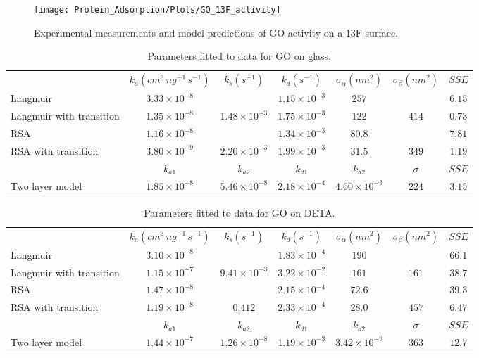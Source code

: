 %
\begin{figure}
\texttt{[image: Protein\_Adsorption/Plots/GO\_13F\_activity]}

\caption{\label{fig:GO 13F activity}Experimental measurements and model predictions
of GO activity on a 13F surface.}
%
\end{figure}
%
\begin{table}
\caption{\label{tab:GO params glass}Parameters fitted to data for GO on glass.}
\begin{tabular}{>{\raggedright}p{0.75in}cccccc}
 & $k_{a}\left(cm^{3}\, ng^{-1}\, s^{-1}\right)$ & $k_{s}\left(s^{-1}\right)$ & $k_{d}\left(s^{-1}\right)$ & $\sigma_{\alpha}\left(nm^{2}\right)$ & $\sigma_{\beta}\left(nm^{2}\right)$ & $SSE$\tabularnewline[\doublerulesep]
\cline{2-7} 
\noalign{\vskip\doublerulesep}
Langmuir & $3.33\times10^{-8}$ &  & $1.15\times10^{-3}$ & $257$ &  & $6.15$\tabularnewline
Langmuir with transition & $1.35\times10^{-8}$ & $1.48\times10^{-3}$ & $1.75\times10^{-3}$ & $122$ & $414$ & $0.73$\tabularnewline
\noalign{\vskip\doublerulesep}
RSA & $1.16\times10^{-8}$ &  & $1.34\times10^{-3}$ & $80.8$ &  & $7.81$\tabularnewline
\noalign{\vskip\doublerulesep}
RSA with transition & $3.80\times10^{-9}$ & $2.20\times10^{-3}$ & $1.99\times10^{-3}$ & $31.5$ & $349$ & $1.19$\tabularnewline
\noalign{\vskip\doublerulesep}
\noalign{\vskip\doublerulesep}
 & $k_{a1}$ & $k_{a2}$ & $k_{d1}$ & $k_{d2}$ & $\sigma$ & $SSE$\tabularnewline
Two layer model & $1.85\times10^{-8}$ & $5.46\times10^{-8}$ & $2.18\times10^{-4}$ & $4.60\times10^{-3}$ & $224$ & $3.15$\tabularnewline
\end{tabular}%
\end{table}
%
\begin{table}
\caption{\label{tab:GO params DETA}Parameters fitted to data for GO on DETA.}
\begin{tabular}{>{\raggedright}p{0.75in}cccccc}
 & $k_{a}\left(cm^{3}\, ng^{-1}\, s^{-1}\right)$ & $k_{s}\left(s^{-1}\right)$ & $k_{d}\left(s^{-1}\right)$ & $\sigma_{\alpha}\left(nm^{2}\right)$ & $\sigma_{\beta}\left(nm^{2}\right)$ & $SSE$\tabularnewline[\doublerulesep]
\cline{2-7} 
\noalign{\vskip\doublerulesep}
Langmuir & $3.10\times10^{-8}$ &  & $1.83\times10^{-4}$ & $190$ &  & $66.1$\tabularnewline
\noalign{\vskip\doublerulesep}
Langmuir with transition & $1.15\times10^{-7}$ & $9.41\times10^{-3}$ & $3.22\times10^{-2}$ & $161$ & $161$ & $38.7$\tabularnewline
\noalign{\vskip\doublerulesep}
RSA & $1.47\times10^{-8}$ &  & $2.15\times10^{-4}$ & $72.6$ &  & $39.3$\tabularnewline
\noalign{\vskip\doublerulesep}
RSA with transition & $1.19\times10^{-8}$ & $0.412$ & $2.33\times10^{-4}$ & $28.0$ & $457$ & $6.47$\tabularnewline
\noalign{\vskip\doublerulesep}
\noalign{\vskip\doublerulesep}
 & $k_{a1}$ & $k_{a2}$ & $k_{d1}$ & $k_{d2}$ & $\sigma$ & $SSE$\tabularnewline
\noalign{\vskip\doublerulesep}
Two layer model & $1.44\times10^{-7}$ & $1.26\times10^{-8}$ & $1.19\times10^{-3}$ & $3.42\times10^{-9}$ & $363$ & $12.7$\tabularnewline
\end{tabular}%
\end{table}
